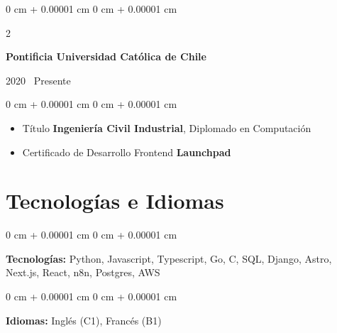 \documentclass[10pt, letterpaper]{article}
\newenvironment{highlights}{
    \begin{itemize}[
        topsep=0.05 cm,
        parsep=0.05 cm,
        partopsep=0pt,
        itemsep=0pt,
        leftmargin=0 cm + 10pt
    ]
}{
    \end{itemize}
} %
\newenvironment{onecolentry}{
    \begin{adjustwidth}{
        0 cm + 0.00001 cm
    }{
        0 cm + 0.00001 cm
    }
}{
    \end{adjustwidth}
} %
\newenvironment{twocolentry}[2][]{
    \onecolentry
    \def\secondColumn{#2}
    \setcolumnwidth{\fill, 4.0 cm}
    \begin{paracol}{2}
}{
    \switchcolumn \raggedleft \secondColumn
    \end{paracol}
    \endonecolentry
} %
\begin{document}
    \begin{twocolentry}{\color{gray} 2020 \textendash\ Presente}
        \textbf{Pontificia Universidad Católica de Chile}
    \end{twocolentry}
    \vspace{0.05 cm}
    \begin{onecolentry}
        \begin{highlights}
            \item Título \textbf{Ingeniería Civil Industrial}, Diplomado en Computación
            \item Certificado de Desarrollo Frontend \textbf{Launchpad}
        \end{highlights}
    \end{onecolentry}

    \section{Tecnologías e Idiomas}

    \begin{onecolentry}
        \textbf{Tecnologías:} Python, Javascript, Typescript, Go, C, SQL, Django, Astro, Next.js, React, n8n, Postgres, AWS
    \end{onecolentry}
    \vspace{0.05 cm}
    \begin{onecolentry}
        \textbf{Idiomas:} Inglés (C1), Francés (B1)
    \end{onecolentry}
\end{document}
